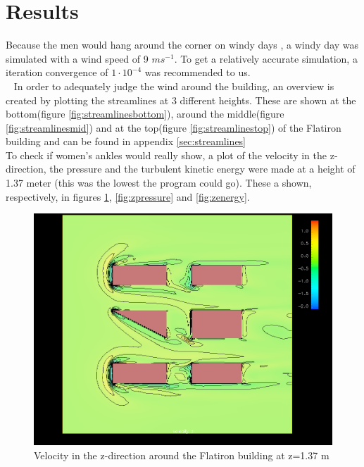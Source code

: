 \section{Results}
\label{sec:results}
Because the men would hang around the corner on windy days \cite{dresses}, a windy day was simulated with a wind speed of 9 $ms^{-1}$. To get a relatively accurate simulation, a iteration convergence of $1\cdot10^{-4}$ was recommended to us. \\\
\indent %
In order to adequately judge the wind around the building, an overview is created by plotting the streamlines at 3 different heights. These are shown at the bottom(figure \ref{fig:streamlinesbottom}), around the middle(figure \ref{fig:streamlinesmid}) and at the top(figure \ref{fig:streamlinestop}) of the Flatiron building and can be found in appendix \ref{sec:streamlines} \\
\indent %
To check if women's ankles would really show, a plot of the velocity in the z-direction, the pressure and the turbulent kinetic energy were made at a height of 1.37 meter (this was the lowest the program could go). These a shown, respectively, in figures \ref{fig:zvelocity}, \ref{fig:zpressure} and \ref{fig:zenergy}. \\
\begin{figure}[h!]
\centering
\includegraphics[width = \textwidth]{zvelocity.png}
\caption{Velocity in the z-direction around the Flatiron building at z=1.37 m}
\label{fig:zvelocity}
\end{figure}\\
